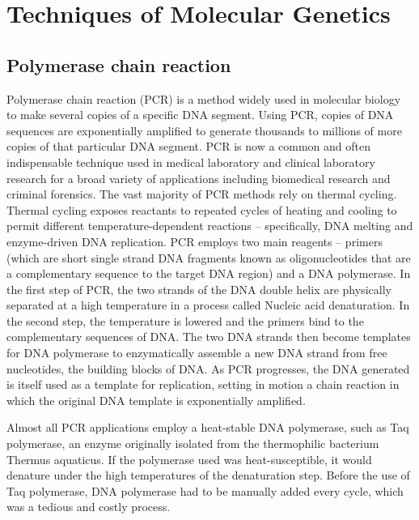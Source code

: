 \chapter{Techniques of Molecular Genetics}\label{techniques-of-molecular-genetics}

\hypertarget{polymerase-chain-reaction}{%
\section{Polymerase chain reaction}\label{polymerase-chain-reaction}}

Polymerase chain reaction (PCR) is a method widely used in molecular biology to make several copies of a specific DNA segment. Using PCR, copies of DNA sequences are exponentially amplified to generate thousands to millions of more copies of that particular DNA segment. PCR is now a common and often indispensable technique used in medical laboratory and clinical laboratory research for a broad variety of applications including biomedical research and criminal forensics. The vast majority of PCR methods rely on thermal cycling. Thermal cycling exposes reactants to repeated cycles of heating and cooling to permit different temperature-dependent reactions -- specifically, DNA melting and enzyme-driven DNA replication. PCR employs two main reagents -- primers (which are short single strand DNA fragments known as oligonucleotides that are a complementary sequence to the target DNA region) and a DNA polymerase. In the first step of PCR, the two strands of the DNA double helix are physically separated at a high temperature in a process called Nucleic acid denaturation. In the second step, the temperature is lowered and the primers bind to the complementary sequences of DNA. The two DNA strands then become templates for DNA polymerase to enzymatically assemble a new DNA strand from free nucleotides, the building blocks of DNA. As PCR progresses, the DNA generated is itself used as a template for replication, setting in motion a chain reaction in which the original DNA template is exponentially amplified.

Almost all PCR applications employ a heat-stable DNA polymerase, such as Taq polymerase, an enzyme originally isolated from the thermophilic bacterium Thermus aquaticus. If the polymerase used was heat-susceptible, it would denature under the high temperatures of the denaturation step. Before the use of Taq polymerase, DNA polymerase had to be manually added every cycle, which was a tedious and costly process.

